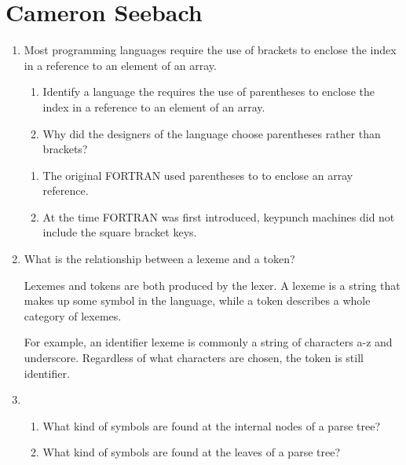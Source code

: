 
\chapter{Cameron Seebach}

\begin{enumerate}
  \item Most programming languages require the use of brackets to
    enclose the index in a reference to an element of an array.
  \begin{enumerate}
    \item Identify a language the requires the use of parentheses
      to enclose the index in a reference to an element of an array.
    \item Why did the designers of the language choose parentheses
      rather than brackets?
    \end{enumerate}

  \begin{answer}

  \begin{enumerate}
    \item The original FORTRAN used parentheses to to enclose an array
      reference.
    \item At the time FORTRAN was first introduced, keypunch machines did not
      include the square bracket keys.
    \end{enumerate}

    \end{answer}

  \item What is the relationship between a lexeme and a token?

  \begin{answer}
    Lexemes and tokens are both produced by the lexer. A lexeme is a string that
    makes up some symbol in the language, while a token describes a whole
    category of lexemes.

    For example, an identifier lexeme is commonly a string of characters a-z and
    underscore. Regardless of what characters are chosen, the token is still
    identifier.
    \end{answer}

  \item
  \begin{enumerate}
    \item What kind of symbols are found at the internal nodes of a
      parse tree?
    \item What kind of symbols are found at the leaves of a parse tree?
    \end{enumerate}


\end{enumerate}
